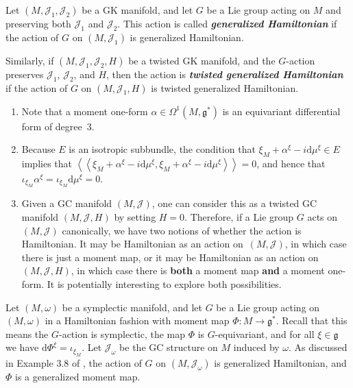 \documentclass[pdftex]{sigma}
\numberwithin{equation}{section}
\newcommand{\deff}[1]{\textbf{\emph{#1}}}
\newcommand{\func}[3]{#1 \colon #2 \to #3}
\newcommand{\iiprod}[2]{\left\langle \! \left\langle {#1} , {#2} \right\rangle \! \right\rangle}
\newcommand{\litlet}{\renewcommand{\labelenumi}{(\alph{enumi})}}
\begin{document}
\begin{Definition}
Let $(M,\mathcal{J}_1,\mathcal{J}_2)$ be a GK manifold, and let $G$ be a Lie group acting on $M$ and preserving both $\mathcal{J}_1$ and $\mathcal{J}_2$.  This action is called \deff{generalized Hamiltonian} if the action of $G$ on $(M,\mathcal{J}_1)$ is generalized Hamiltonian.

Similarly, if $(M,\mathcal{J}_1,\mathcal{J}_2,H)$ be a twisted GK manifold, and the $G$-action preserves $\mathcal{J}_1$, $\mathcal{J}_2$, and $H$, then the action is \deff{twisted generalized Hamiltonian} if the action of $G$ on $(M,\mathcal{J}_1,H)$ is twisted generalized Hamiltonian.
\end{Definition}


\begin{Remark} \label{rem1} \qquad
\begin{enumerate} \itemsep=0pt\litlet
  \item Note that a moment one-form $\alpha \in \Omega^1(M,\mathfrak{g}^*)$ is an equivariant dif\/ferential form of degree~$3$.

  \item Because $E$ is an isotropic subbundle, the condition that $\xi_M + \alpha^{\xi} - i \mathrm{d} \mu^{\xi} \in E$ implies that $\iiprod{\xi_M + \alpha^{\xi} - i \mathrm{d} \mu^{\xi}}{\xi_M + \alpha^{\xi} - i \mathrm{d} \mu^{\xi}}=0$, and hence that $\iota_{\xi_M} \alpha^{\xi} = \iota_{\xi_M} \mathrm{d} \mu^{\xi} = 0$.

  \item Given a GC manifold $(M,\mathcal{J})$, one can consider this as a twisted GC manifold $(M,\mathcal{J},H)$ by setting $H=0$.  Therefore, if a Lie group $G$ acts on $(M,\mathcal{J})$ canonically, we have two notions of whether the action is Hamiltonian.  It may be Hamiltonian as an action on~$(M,\mathcal{J})$, in which case there is just a moment map, or it may be Hamiltonian as an action on $(M,\mathcal{J},H)$, in which case there is {\bf both} a moment map {\bf and} a moment one-form.
  It is potentially interesting to explore both possibilities.
\end{enumerate}
\end{Remark}


\begin{Example} \label{example3}
Let $(M,\omega)$ be a symplectic manifold, and let $G$ be a Lie group acting on $(M,\omega)$ in a Hamiltonian fashion with moment map $\func{\Phi}{M}{\mathfrak{g}^*}$.  Recall that this means the $G$-action is symplectic, the map $\Phi$ is $G$-equivariant, and for all $\xi \in \mathfrak{g}$ we have $\mathrm{d} \Phi^{\xi} = \iota_{\xi_M}$.
Let $\mathcal{J}_{\omega}$ be the GC structure on $M$ induced by $\omega$.  As discussed in Example 3.8 of \cite{lintolman}, the action of $G$ on $(M,\mathcal{J}_{\omega})$ is generalized Hamiltonian, and $\Phi$ is a generalized moment map.
\end{Example}
\end{document}
